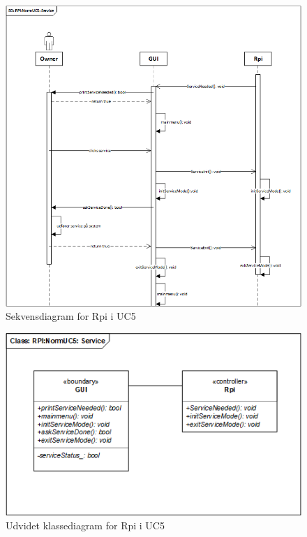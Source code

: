 \begin{figure}[H]
    \centering
    \includegraphics[width=1\textwidth]{Images/Applikationsmodeller/rpi/rpi_sekvensdiagramNormUC5.png}
    \caption{Sekvensdiagram for Rpi i UC5}
    \label{fig:sdUC4Rpi}
\end{figure}

\begin{figure}[H]
    \centering
    \includegraphics[width=1\textwidth]{Images/Applikationsmodeller/rpi/rpi_UdvidetklassediagramNormUC5.png}
    \caption{Udvidet klassediagram for Rpi i UC5}
    \label{fig:UcdUC5Rpi}
\end{figure}

